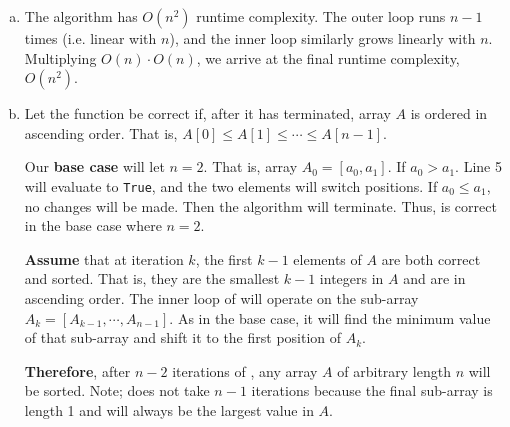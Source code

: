 \documentclass[11pt]{article}
\begin{document}
\begin{enumerate}[(a)]
    \item The  algorithm has $O(n^{2})$ runtime complexity. The 
        outer loop runs $n-1$ times (i.e. linear with $n$), and the inner loop
        similarly grows linearly with $n$. Multiplying $O(n) \cdot O(n)$, we
        arrive at the final runtime complexity, $\boxed{O(n^{2})}$.
    \item Let the  function be correct if, after it has terminated,
        array $A$ is ordered in ascending order. That is, 
        $A[0]\le A[1] \le \cdots \le A[n-1]$.         

        Our \textbf{base case} will let $n=2$. That is,
        array $A_{0} = [a_{0}, a_{1}]$. If $a_{0} > a_{1}$. Line 5 will
        evaluate to \texttt{True}, and the two elements will switch positions.
        If $a_{0} \le a_{1}$, no changes will be made. Then the algorithm will
        terminate. Thus,  is correct in the base case where $n=2$.

        \textbf{Assume} that at iteration $k$, the first $k-1$ elements of $A$
        are both correct and sorted. That is, they are the smallest $k-1$
        integers in $A$ and are in ascending order. The inner loop of 
         will operate on the sub-array 
        $A_{k} = [A_{k-1}, \cdots ,A_{n-1}]$. As in the base case, it will
        find the minimum value of that sub-array and shift it to the first
        position of $A_{k}$.

        \textbf{Therefore}, after $n-2$ iterations of , any array 
        $A$ of arbitrary length $n$ will be sorted. Note;  does 
        not take $n-1$ iterations because the final sub-array is length 1 and 
        will always be the largest value in $A$.
\end{enumerate}


\newpage
\end{document}
